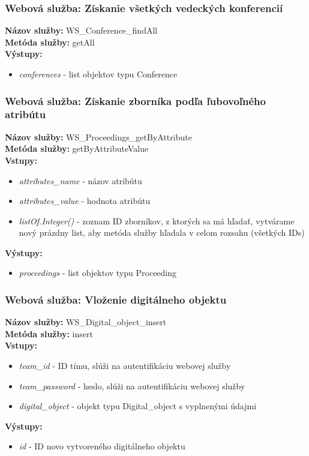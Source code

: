\documentclass[10pt,oneside,slovak,a4paper]{article}
\begin{document}
\subsubsection{Webová služba: Získanie všetkých vedeckých konferencií}
\textbf{Názov služby:} WS\_Conference\_findAll\\
\textbf{Metóda služby:} getAll\\
\textbf{Výstupy:}
	\begin{itemize}
		\item \textit{conferences} - list objektov typu Conference
	\end{itemize}
	
\subsubsection{Webová služba: Získanie zborníka podľa ľubovoľného atribútu}
\textbf{Názov služby:} WS\_Proceedings\_getByAttribute\\
\textbf{Metóda služby:} getByAttributeValue\\
\textbf{Vstupy:}
	\begin{itemize}
		\item \textit{attributes\_name} - názov atribútu
		\item \textit{attributes\_value} - hodnota atribútu
		\item \textit{listOf.Integer()} - zoznam ID zborníkov, z ktorých sa má hľadať, vytvárame nový prázdny list, aby metóda služby hľadala v celom rozsahu (všetkých IDs)
	\end{itemize}
\textbf{Výstupy:}
	\begin{itemize}
		\item \textit{proceedings} - list objektov typu Proceeding
	\end{itemize}
	
\subsubsection{Webová služba: Vloženie digitálneho objektu}
\textbf{Názov služby:} WS\_Digital\_object\_insert\\
\textbf{Metóda služby:} insert\\
\textbf{Vstupy:}
	\begin{itemize}
		\item \textit{team\_id} - ID tímu, slúži na autentifikáciu webovej služby
		\item \textit{team\_password} - heslo, slúži na autentifikáciu webovej služby
		\item \textit{digital\_object} - objekt typu Digital\_object s vyplnenými údajmi
	\end{itemize}
\textbf{Výstupy:}
	\begin{itemize}
		\item \textit{id} - ID novo vytvoreného digitálneho objektu
	\end{itemize}
	
\end{document}
